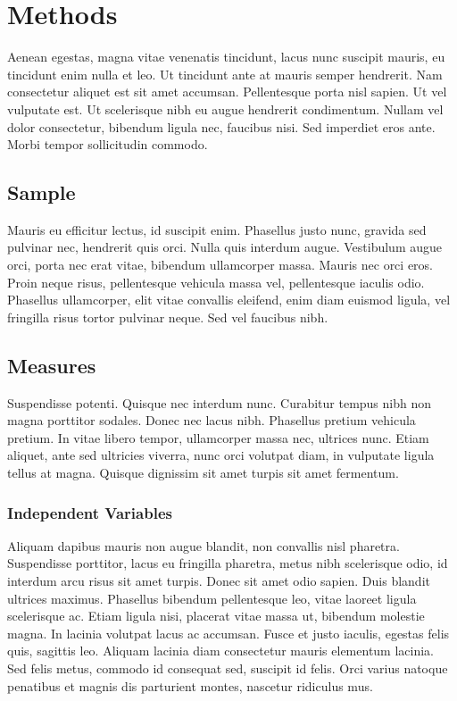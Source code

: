 \section{Methods}
\label{sec:3}

Aenean egestas, magna vitae venenatis tincidunt, lacus nunc suscipit mauris, eu tincidunt enim nulla et leo. Ut tincidunt ante at mauris semper hendrerit. Nam consectetur aliquet est sit amet accumsan. Pellentesque porta nisl sapien. Ut vel vulputate est. Ut scelerisque nibh eu augue hendrerit condimentum. Nullam vel dolor consectetur, bibendum ligula nec, faucibus nisi. Sed imperdiet eros ante. Morbi tempor sollicitudin commodo.

\subsection{Sample}

Mauris eu efficitur lectus, id suscipit enim. Phasellus justo nunc, gravida sed pulvinar nec, hendrerit quis orci. Nulla quis interdum augue. Vestibulum augue orci, porta nec erat vitae, bibendum ullamcorper massa. Mauris nec orci eros. Proin neque risus, pellentesque vehicula massa vel, pellentesque iaculis odio. Phasellus ullamcorper, elit vitae convallis eleifend, enim diam euismod ligula, vel fringilla risus tortor pulvinar neque. Sed vel faucibus nibh.

\subsection{Measures}

Suspendisse potenti. Quisque nec interdum nunc. Curabitur tempus nibh non magna porttitor sodales. Donec nec lacus nibh. Phasellus pretium vehicula pretium. In vitae libero tempor, ullamcorper massa nec, ultrices nunc. Etiam aliquet, ante sed ultricies viverra, nunc orci volutpat diam, in vulputate ligula tellus at magna. Quisque dignissim sit amet turpis sit amet fermentum.

\subsubsection{Independent Variables}

Aliquam dapibus mauris non augue blandit, non convallis nisl pharetra. Suspendisse porttitor, lacus eu fringilla pharetra, metus nibh scelerisque odio, id interdum arcu risus sit amet turpis. Donec sit amet odio sapien. Duis blandit ultrices maximus. Phasellus bibendum pellentesque leo, vitae laoreet ligula scelerisque ac. Etiam ligula nisi, placerat vitae massa ut, bibendum molestie magna. In lacinia volutpat lacus ac accumsan. Fusce et justo iaculis, egestas felis quis, sagittis leo. Aliquam lacinia diam consectetur mauris elementum lacinia. Sed felis metus, commodo id consequat sed, suscipit id felis. Orci varius natoque penatibus et magnis dis parturient montes, nascetur ridiculus mus.

